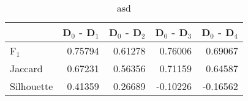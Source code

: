 \begin{table}
\centering
\caption{asd}
\label{asd}
\begin{tabular}{lrrrr}
\toprule
{} &  D$_0$ - D$_1$ &  D$_0$ - D$_2$ &  D$_0$ - D$_3$ &  D$_0$ - D$_4$ \\
\midrule
F$_1$      &        0.75794 &        0.61278 &        0.76006 &        0.69067 \\
Jaccard    &        0.67231 &        0.56356 &        0.71159 &        0.64587 \\
Silhouette &        0.41359 &        0.26689 &       -0.10226 &       -0.16562 \\
\bottomrule
\end{tabular}
\end{table}
